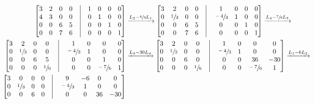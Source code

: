 \documentclass[leqno]{article}
\begin{document}
\begin{enumerate}
    \begin{align*}
        \begin{bmatrix}
        3 & 2 & 0 & 0 & \bigm| & 1 & 0 & 0 & 0\\
        4 & 3 & 0 & 0 & \bigm| & 0 & 1 & 0 & 0\\
        0 & 0 & 6 & 5 & \bigm| & 0 & 0 & 1 & 0\\
        0 & 0 & 7 & 6 & \bigm| & 0 & 0 & 0 & 1\\
        \end{bmatrix}&\xrightarrow{L_2-\sfrac{4}{3}L_1}\begin{bmatrix}
        3 & 2 & 0 & 0 & \bigm| & 1 & 0 & 0 & 0\\
        0 & \sfrac{1}{3} & 0 & 0 & \bigm| & \sfrac{-4}{3} & 1 & 0 & 0\\
        0 & 0 & 6 & 5 & \bigm| & 0 & 0 & 1 & 0\\
        0 & 0 & 7 & 6 & \bigm| & 0 & 0 & 0 & 1\\
        \end{bmatrix}\xrightarrow{L_4-\sfrac{7}{6}L_3}\\
        \begin{bmatrix}
        3 & 2 & 0 & 0 & \bigm| & 1 & 0 & 0 & 0\\
        0 & \sfrac{1}{3} & 0 & 0 & \bigm| & \sfrac{-4}{3} & 1 & 0 & 0\\
        0 & 0 & 6 & 5 & \bigm| & 0 & 0 & 1 & 0\\
        0 & 0 & 0 & \sfrac{1}{6} & \bigm| & 0 & 0 & \sfrac{-7}{6} & 1\\
        \end{bmatrix}&\xrightarrow{L_3-30L_4}\begin{bmatrix}
        3 & 2 & 0 & 0 & \bigm| & 1 & 0 & 0 & 0\\
        0 & \sfrac{1}{3} & 0 & 0 & \bigm| & \sfrac{-4}{3} & 1 & 0 & 0\\
        0 & 0 & 6 & 0 & \bigm| & 0 & 0 & 36 & -30\\
        0 & 0 & 0 & \sfrac{1}{6} & \bigm| & 0 & 0 & \sfrac{-7}{6} & 1\\
        \end{bmatrix}\xrightarrow{L_1-6L_2}\\
        \begin{bmatrix}
        3 & 0 & 0 & 0 & \bigm| & 9 & -6 & 0 & 0\\
        0 & \sfrac{1}{3} & 0 & 0 & \bigm| & \sfrac{-4}{3} & 1 & 0 & 0\\
        0 & 0 & 6 & 0 & \bigm| & 0 & 0 & 36 & -30\\

\end{bmatrix}
\end{align*}
\end{enumerate}
\end{document}
